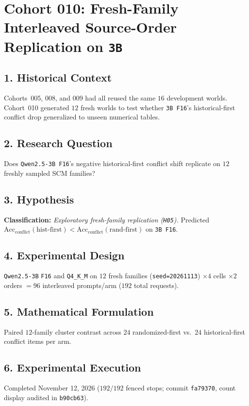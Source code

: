 \section{Cohort 010: Fresh-Family Interleaved Source-Order Replication on \texttt{3B}}

\subsection*{1. Historical Context}
Cohorts~005, 008, and 009 had all reused the same $16$ development worlds. Cohort~010 generated $12$ fresh worlds to test whether \texttt{3B F16}'s historical-first conflict drop generalized to unseen numerical tables.

\subsection*{2. Research Question}
Does \texttt{Qwen2.5-3B F16}'s negative historical-first conflict shift replicate on $12$ freshly sampled SCM families?

\subsection*{3. Hypothesis}
\textbf{Classification:} \emph{Exploratory fresh-family replication (\texttt{H05}).} Predicted $\mathrm{Acc}_{\mathrm{conflict}}(\mathrm{hist\text{-}first}) < \mathrm{Acc}_{\mathrm{conflict}}(\mathrm{rand\text{-}first})$ on \texttt{3B F16}.

\subsection*{4. Experimental Design}
\texttt{Qwen2.5-3B} \texttt{F16} and \texttt{Q4\_K\_M} on $12$ fresh families (\texttt{seed=20261113}) $\times 4$ cells $\times 2$ orders $= 96$ interleaved prompts/arm ($192$ total requests).

\subsection*{5. Mathematical Formulation}
Paired $12$-family cluster contrast across $24$ randomized-first vs.\ $24$ historical-first conflict items per arm.

\subsection*{6. Experimental Execution}
Completed November 12, 2026 ($192/192$ fenced stops; commit \texttt{fa79370}, count display audited in \texttt{b90cb63}).

